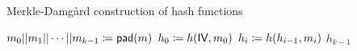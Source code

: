 \begin{algorithm}[t]
\caption{Merkle-Damg\r{a}rd construction of hash functions}
\label{alg:md_construction}
\begin{algorithmic}[1]
    \State $m_{0}||m_{1}||\cdots||m_{k-1} \coloneqq{} \textsf{pad}(m)$
    \State $h_{0} \coloneqq{} h(\textsf{IV}, m_{0})$
        \State $h_{i} \coloneqq{} h(h_{i-1}, m_{i})$
    \EndFor
    \State \Return $h_{k-1}$
\EndProcedure
\end{algorithmic}
\end{algorithm}
